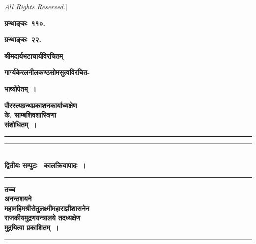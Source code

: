 \documentclass[11pt, openany]{book}
\begin{document}
\emph{\en All Rights Reserved.}]\

\newpage

\begin{center}

\vspace{0.4cm}\large\textbf{ग्रन्थाङ्कः~११०.}


\vspace{0.2cm}\textbf{ग्रन्थाङ्कः~२२.}

\vspace{0.2cm}

{\Large\textbf{श्रीमदार्यभटाचार्यविरचितम् }}


\vspace{0.2cm}\textbf{गार्ग्यकेरलनीलकण्ठसोमसुत्वविरचित- }

\textbf{भाष्योपेतम्~।}

\vspace{0.2cm}

\textbf{पौरस्त्यग्रन्थप्रकाशनकार्याध्यक्षेण \\ के. साम्बशिवशास्त्रिणा\\ संशोधितम्~।}

\rule{2cm}{0.3mm}

\vspace{0.1cm}

\begin{center}
\rule{6cm}{0.3mm}\\
\vspace{0.2cm}
\textbf{द्वितीयः सम्पुटः \textendash\ कालक्रियापादः~। }\\
\rule{6cm}{0.3mm}
\end{center}

\vspace{0.1cm}

\textbf{तच्च \\ अनन्तशयने \\ महामहिमश्रीसेतुलक्ष्मीमहाराज्ञीशासनेन \\ राजकीयमुद्रणयन्त्रालये तदध्यक्षेण \\ मुद्रयित्वा प्रकाशितम्~।}

\rule{2cm}{0.3mm}

\end{center}
\end{document}
